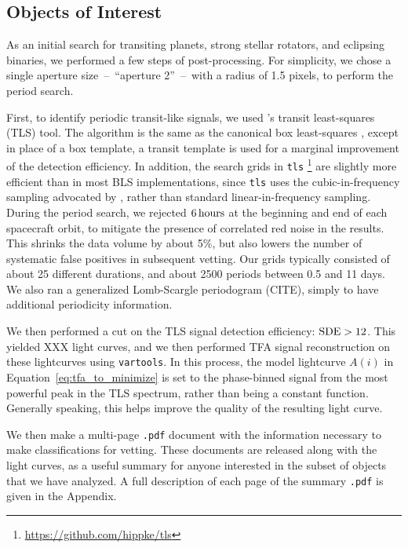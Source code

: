 \documentclass[12pt,twocolumn,tighten]{aastex62}
\begin{document}
\subsection{Objects of Interest}
\label{subsec:ctois}

As an initial search for transiting planets, strong stellar rotators, and 
eclipsing binaries, we performed a few steps of post-processing. For 
simplicity,
we chose a single aperture size~--~``aperture 2''~--~with a radius of 1.5 
pixels, to perform the period search.

First, to identify periodic transit-like signals, we used 
\citet{hippke_TLS_2019}'s transit least-squares (TLS) tool.
The algorithm is the same as the canonical box least-squares
\citep{kovacs_box-fitting_2002}, except in place of a box template, a transit 
template is used  for a marginal improvement of the detection efficiency.
In addition, the search grids in \texttt{tls} 
\footnote{\url{https://github.com/hippke/tls}} are slightly more 
efficient than in most BLS implementations, since \texttt{tls} uses the 
cubic-in-frequency sampling advocated by \citet{ofir_optimizing_2014}, 
rather than standard linear-in-frequency sampling.
During the period search, we rejected $6\,{\rm hours}$ at the
beginning and end of each spacecraft orbit, to mitigate the presence
of correlated red noise in the results.
This shrinks the data volume by about 5\%, but also lowers the number
of systematic false positives in subsequent vetting.
Our grids typically consisted of about 25 different durations, and
about 2500 periods between 0.5 and 11 days. 
We also ran a generalized Lomb-Scargle periodogram (CITE), simply to 
have additional periodicity information.

We then performed a cut on the TLS signal detection efficiency:
${\rm SDE} > 12$.
This yielded XXX light curves, and we then
performed TFA signal reconstruction on these lightcurves using 
\texttt{vartools}.
In this process, the model lightcurve $A(i)$ in 
Equation~\ref{eq:tfa_to_minimize} is set to the phase-binned signal from the 
most powerful peak in the TLS spectrum, rather than being a constant function. 
Generally speaking, this helps improve the quality of the resulting light 
curve.

We then make a multi-page \texttt{.pdf} document with the information 
necessary to make classifications for vetting.
These documents are released along with the light curves, as a useful summary
 for anyone interested in the subset of objects that we have analyzed.
A full description of each page of the summary \texttt{.pdf} is given in the 
Appendix.
\end{document}
